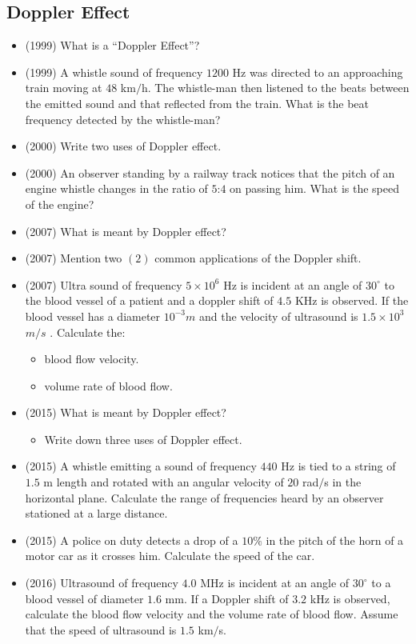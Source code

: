 \documentclass{article}
\begin{document}
\subsection{Doppler Effect}
\begin{itemize}
\item (1999)  What is a “Doppler Effect”?
\item (1999)  A whistle sound of frequency $ 1200$ Hz was directed to an approaching train moving at $ 48$ km$/$h​ . The whistle-man then listened to the beats between the emitted sound and that reflected from the train. What is the beat frequency detected by the whistle-man?
\item (2000)  Write two uses of Doppler effect.
\item (2000)  An observer standing by a railway track notices that the pitch of an engine whistle changes in the ratio of $ 5$:$ 4$ on passing him. What is the speed of the engine?
\item (2007)  What is meant by Doppler effect? 
\item (2007)  Mention two $ (2)$ common applications of the Doppler shift. 
\item (2007)  Ultra sound of frequency $ 5 \times 10^{6}$ Hz is incident at an angle of $ 30^{\circ}$ to the blood vessel of a patient and a doppler shift of $ 4.5$ KHz is observed. If the blood vessel has a diameter $ 10^{-3}m$ and the velocity of ultrasound is $ 1.5 \times 10^{3}$  $ m/s$ . Calculate the:\begin{itemize}
\item blood flow velocity. 
\item volume rate of blood flow. 
\end{itemize}
\item (2015)  What is meant by Doppler effect?\begin{itemize}
\item Write down three uses of Doppler effect.
\end{itemize}
\item (2015)  A whistle emitting a sound of frequency $ 440$ Hz is tied to a string of $ 1.5$ m length and rotated with an angular velocity of $ 20$ rad$/$s in the horizontal plane.  Calculate the range of frequencies heard by an observer stationed at a large distance.
\item (2015)  A police on duty detects a drop of a $ 10\%$ in the pitch of the horn of a motor car as it crosses him. Calculate the speed of the car.
\item (2016)  Ultrasound of frequency $ 4.0$ MHz is incident at an angle of $ 30^{\circ}$ to a blood vessel of diameter $ 1.6$ mm.  If a Doppler shift of $ 3.2$ kHz is observed, calculate the blood flow velocity and the volume rate of blood flow.  Assume that the speed of ultrasound is $ 1.5$ km$/$s.

\end{itemize}
\end{document}
